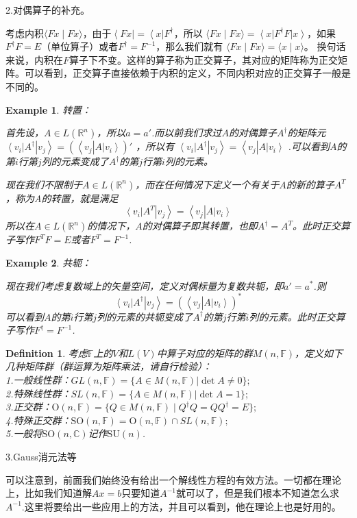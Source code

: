 \documentclass[11pt,a4paper,openany]{book}%
\theoremstyle{plain}%
\newtheorem{defi}{Definition}[chapter]%
\newtheorem{exa}{Example}[chapter]%
\newcommand{\bra}[1]{\left\langle #1\right|} %
\newcommand{\ket}[1]{\left| #1\right\rangle}
\newcommand{\braket}[2]{\langle #1 \mid #2 \rangle}
\begin{document}
\noindent 2.对偶算子的补充。

考虑内积$\braket{Fx}{Fx}$，由于$\bra{Fx}=\bra{x}F^\dag$，所以
$\braket{Fx}{Fx}=\bra{x}F^\dag F\ket{x}$，如果$F^\dag F=E$（单位算子）或者$F^\dag=F^{-1}$，那么我们就有
$
\braket{Fx}{Fx}=\braket{x}{x}
$。
换句话来说，内积在$F$算子下不变。这样的算子称为正交算子，其对应的矩阵称为正交矩阵。可以看到，正交算子直接依赖于内积的定义，不同内积对应的正交算子一般是不同的。
\begin{exa}转置：

首先设，$A\in L(\mathbb{R}^n)$，所以$a=a'$.而以前我们求过$A$的对偶算子$A^\dag$的矩阵元
$
\bra{v_i}A^\dag\ket{v_j}=(\bra{v_j}A\ket{v_i})'
$
，所以有
$
\bra{v_i}A^\dag\ket{v_j}=\bra{v_j}A\ket{v_i}
$
.可以看到$A$的第$i$行第$j$列的元素变成了$A^\dag$的第$j$行第$i$列的元素。

现在我们不限制于$A\in L(\mathbb{R}^n)$，而在任何情况下定义一个有关于$A$的新的算子$A^T$，称为A的转置，就是满足
\[
\bra{v_i}A^T\ket{v_j}=\bra{v_j}A\ket{v_i}
\]
所以在$A\in L(\mathbb{R}^n)$的情况下，$A$的对偶算子即其转置，也即$A^\dag=A^T$。此时正交算子写作$F^T F=E$或者$F^T=F^{-1}$.
\end{exa}
\begin{exa}共轭：

现在我们考虑复数域上的矢量空间，定义对偶标量为复数共轭，即$a'=a^*$.则
\[
\bra{v_i}A^\dag\ket{v_j}=(\bra{v_j}A\ket{v_i})^*
\]
可以看到$A$的第$i$行第$j$列的元素的共轭变成了$A^\dag$的第$j$行第$i$列的元素。此时正交算子写作$F^\dag=F^{-1}$.
\end{exa}
\begin{defi}
考虑$\mathbb{F}$上的$V$和$L(V)$中算子对应的矩阵的群$M(n,\mathbb{F})$，定义如下几种矩阵群（群运算为矩阵乘法，请自行检验）：\\
1.一般线性群：$GL(n,\mathbb{F})=\{A\in M(n,\mathbb{F})|\det A\neq 0\};$\\
2.特殊线性群：$SL(n,\mathbb{F})=\{A\in M(n,\mathbb{F})|\det A=1\};$\\
3.正交群：$\mathrm{O}(n,\mathbb{F}) = \{ Q \in M(n,\mathbb{F}) \mid Q^\dag Q = Q Q^\dag = E \};$\\
4.特殊正交群：$\mathrm{SO}(n,\mathbb{F}) =\mathrm{O}(n,\mathbb{F})\cap SL(n,\mathbb{F});$\\
5.一般将$\mathrm{SO}(n,\mathbb{C}) $记作$\mathrm{SU}(n)$.
\end{defi}
\noindent 3.Gauss消元法等

可以注意到，前面我们始终没有给出一个解线性方程的有效方法。一切都在理论上，比如我们知道解$Ax=b$只要知道$A^{-1}$就可以了，但是我们根本不知道怎么求$A^{-1}$.这里将要给出一些应用上的方法，并且可以看到，他在理论上也是好用的。
\end{document}
